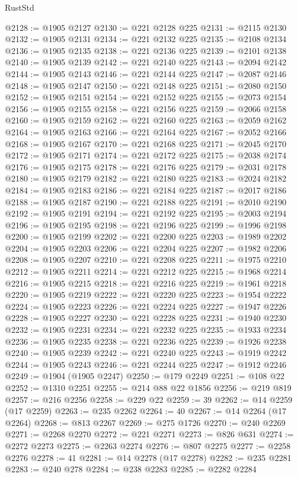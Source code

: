 \begin{lexlean}{RustStd}
\begin{coremodule}
@2128 := @1905 @2127
@2130 := @221 @2128 @225
@2131 := @2115 @2130
@2132 := @1905 @2131
@2134 := @221 @2132 @225
@2135 := @2108 @2134
@2136 := @1905 @2135
@2138 := @221 @2136 @225
@2139 := @2101 @2138
@2140 := @1905 @2139
@2142 := @221 @2140 @225
@2143 := @2094 @2142
@2144 := @1905 @2143
@2146 := @221 @2144 @225
@2147 := @2087 @2146
@2148 := @1905 @2147
@2150 := @221 @2148 @225
@2151 := @2080 @2150
@2152 := @1905 @2151
@2154 := @221 @2152 @225
@2155 := @2073 @2154
@2156 := @1905 @2155
@2158 := @221 @2156 @225
@2159 := @2066 @2158
@2160 := @1905 @2159
@2162 := @221 @2160 @225
@2163 := @2059 @2162
@2164 := @1905 @2163
@2166 := @221 @2164 @225
@2167 := @2052 @2166
@2168 := @1905 @2167
@2170 := @221 @2168 @225
@2171 := @2045 @2170
@2172 := @1905 @2171
@2174 := @221 @2172 @225
@2175 := @2038 @2174
@2176 := @1905 @2175
@2178 := @221 @2176 @225
@2179 := @2031 @2178
@2180 := @1905 @2179
@2182 := @221 @2180 @225
@2183 := @2024 @2182
@2184 := @1905 @2183
@2186 := @221 @2184 @225
@2187 := @2017 @2186
@2188 := @1905 @2187
@2190 := @221 @2188 @225
@2191 := @2010 @2190
@2192 := @1905 @2191
@2194 := @221 @2192 @225
@2195 := @2003 @2194
@2196 := @1905 @2195
@2198 := @221 @2196 @225
@2199 := @1996 @2198
@2200 := @1905 @2199
@2202 := @221 @2200 @225
@2203 := @1989 @2202
@2204 := @1905 @2203
@2206 := @221 @2204 @225
@2207 := @1982 @2206
@2208 := @1905 @2207
@2210 := @221 @2208 @225
@2211 := @1975 @2210
@2212 := @1905 @2211
@2214 := @221 @2212 @225
@2215 := @1968 @2214
@2216 := @1905 @2215
@2218 := @221 @2216 @225
@2219 := @1961 @2218
@2220 := @1905 @2219
@2222 := @221 @2220 @225
@2223 := @1954 @2222
@2224 := @1905 @2223
@2226 := @221 @2224 @225
@2227 := @1947 @2226
@2228 := @1905 @2227
@2230 := @221 @2228 @225
@2231 := @1940 @2230
@2232 := @1905 @2231
@2234 := @221 @2232 @225
@2235 := @1933 @2234
@2236 := @1905 @2235
@2238 := @221 @2236 @225
@2239 := @1926 @2238
@2240 := @1905 @2239
@2242 := @221 @2240 @225
@2243 := @1919 @2242
@2244 := @1905 @2243
@2246 := @221 @2244 @225
@2247 := @1912 @2246
@2249 := @1904 (@1905 @2247)
@2250 := @179 @2249
@2251 := @108 @22
@2252 := @1310 @2251
@2255 := @214 @88 @22 @1856
@2256 := @219 @819
@2257 := @216 @2256
@2258 := @229 @22
@2259 := 39
@2262 := @14 @2259 (@17 @2259)
@2263 := @235 @2262
@2264 := 40
@2267 := @14 @2264 (@17 @2264)
@2268 := @813 @2267
@2269 := @275 @1726
@2270 := @240 @2269
@2271 := @2268 @2270
@2272 := @221 @2271
@2273 := @826 @631
@2274 := @2272 @2273
@2275 := @2263 @2274
@2276 := @807 @2275
@2277 := @2258 @2276
@2278 := 41
@2281 := @14 @2278 (@17 @2278)
@2282 := @235 @2281
@2283 := @240 @278
@2284 := @238 @2283
@2285 := @2282 @2284

\end{coremodule}
\end{lexlean}
